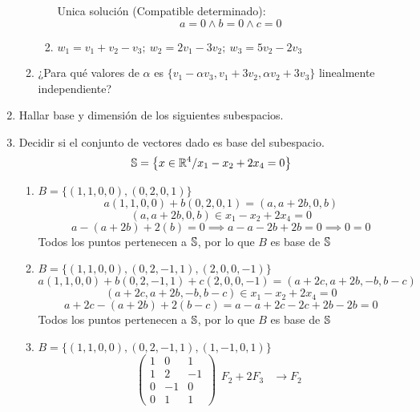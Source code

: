 \documentclass[../practica.root.tex]{subfiles}
\begin{document}
\begin{enumerate}
\begin{enumerate}
\begin{enumerate}
\[                              \]
                              Unica solución (Compatible determinado):
                              \[ a = 0 \land b = 0 \land c = 0 \]
                        \item $ w_1 = v_1 + v_2 - v_3;\ w_2 = 2v_1 - 3v_2;\ w_3 = 5v_2 - 2v_3 $
                    \end{enumerate}
              \item ¿Para qué valores de $\alpha$ es $\{ v_1 - \alpha v_3, v_1 + 3v_2, \alpha v_2 + 3v_3 \}$ linealmente independiente?
          \end{enumerate}
    \item Hallar base y dimensión de los siguientes subespacios.
    \item Decidir si el conjunto de vectores dado es base del subespacio.
          \[ \S = \left\{ x \in \R^4 / x_1 - x_2 + 2x_4 = 0 \right\} \]
          \begin{enumerate}
              \item $B = \{ (1,1,0,0),(0,2,0,1) \}$
                    \[ a(1,1,0,0) + b(0,2,0,1) = (a, a + 2b, 0, b) \]
                    \[ (a, a + 2b, 0, b) \in x_1 - x_2 + 2x_4 = 0 \]
                    \[ a - (a + 2b) + 2(b) = 0 \implies  a - a - 2b + 2b = 0 \implies 0 = 0 \]
                    Todos los puntos pertenecen a $\S$, por lo que $B$ es base de $\S$
              \item $B = \{ (1,1,0,0),(0,2,-1,1),(2,0,0,-1) \}$
                    \[ a(1,1,0,0) + b(0,2,-1,1) + c(2,0,0,-1) = (a + 2c,a + 2b, -b, b - c) \]
                    \[ (a + 2c,a + 2b, -b, b - c) \in x_1 - x_2 + 2x_4 = 0 \]
                    \[ a + 2c - (a + 2b) + 2(b - c) = a-a + 2c-2c + 2b-2b = 0 \]
                    Todos los puntos pertenecen a $\S$, por lo que $B$ es base de $\S$
              \item $B = \{ (1,1,0,0),(0,2,-1,1),(1,-1,0,1) \}$
                    \[ \begin{pmatrix}
                            1 & 0  & 1  \\
                            1 & 2  & -1 \\
                            0 & -1 & 0  \\
                            0 & 1  & 1
                        \end{pmatrix}
                        \begin{array}{rl}
                            F_2 + 2F_3 & \to F_2 \\

\end{array}\]
\end{enumerate}
\end{enumerate}
\end{document}
